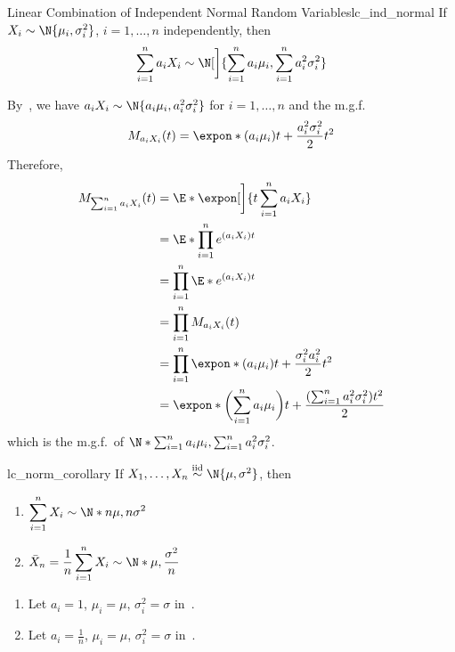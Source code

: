 \begin{Theorem}{Linear Combination of Independent Normal Random Variables}{lc_ind_normal}
    If $ X_i \sim \N{\mu_i,\sigma_i^2} $, $ i=1,\ldots,n $
    independently, then
    \[ \sum_{i=1}^{n} a_i X_i \sim \N[\bigg]{\sum_{i=1}^{n} a_i\mu_i,
            \sum_{i=1}^{n} a_i^2\sigma_i^2} \]
\end{Theorem}
\begin{Proof}{}{}
    By~, we have
    $ a_i X_i \sim \N{a_i\mu_i,a_i^2\sigma_i^2} $ for $ i=1,\ldots, n $
    and the m.g.f.\
    \[ M_{a_i X_i}(t)=\expon*{(a_i\mu_i)t+\frac{a_i^2\sigma_i^2}{2}t^2} \]
    Therefore,
    \begin{align*}
        M_{\sum_{i=1}^{n} a_i X_i}(t)
         & =\E*{\expon[\bigg]{t \sum_{i=1}^{n} a_i X_i}}                      \\
         & =\E*{\prod_{i=1}^n e^{(a_i X_i)t}}                                 \\
         & =\prod_{i=1}^n\E*{e^{(a_i X_i)t}}                                  \\
         & =\prod_{i=1}^n M_{a_i X_i}(t)                                      \\
         & =\prod_{i=1}^n \expon*{(a_i\mu_i)t+\frac{\sigma_i^2 a_i^2}{2}t^2 } \\
         & =\expon*{\biggl(\sum_{i=1}^{n} a_i\mu_i\biggr)t
            +\frac{(\sum_{i=1}^{n} a_i^2\sigma_i^2)t^2}{2}}
    \end{align*}
    which is the m.g.f.\ of
    $ \N*{\sum_{i=1}^{n} a_i\mu_i,\sum_{i=1}^{n} a_i^2\sigma_i^2} $.
\end{Proof}
\begin{Corollary}{}{lc_norm_corollary}
    If $ X_1,\ldots,X_n \stackrel{\text{iid}}{\sim} \N{\mu,\sigma^2} $,
    then
    \begin{enumerate}[label=(\arabic*)]
        \item $ \displaystyle  \sum_{i=1}^{n} X_i \sim \N*{n\mu,n\sigma^2} $
        \item $ \displaystyle \bar{X}_n=\frac{1}{n} \sum_{i=1}^{n} X_i \sim \N*{\mu,\frac{\sigma^2}{n}} $
    \end{enumerate}
\end{Corollary}
\begin{Proof}{}{}
    \begin{enumerate}[label=(\arabic*)]
        \item Let $ a_i=1 $, $ \mu_i=\mu $, $ \sigma_i^2=\sigma $ in~.
        \item Let $ a_i=\frac{1}{n} $, $ \mu_i=\mu $, $ \sigma_i^2=\sigma $ in~.
    \end{enumerate}
\end{Proof}
